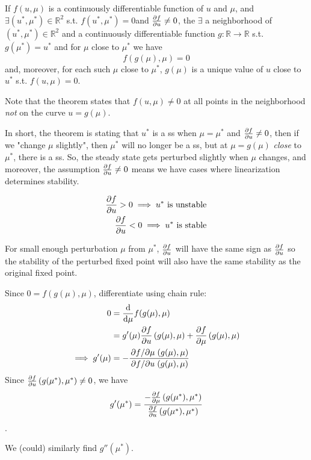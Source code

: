 \documentclass[12pt, oneside]{article}
\begin{document}
\begin{theorem}\label{thm:ift}
  If $f(u, \mu)$ is a continuously differentiable function of $u$ and $\mu$, and $\exists (u^*,\mu^*) \in \mathbb{R}^2$ s.t. $f(u^*,\mu^*) = 0$\footnotemark and $\pdv{f}{u}(u^*,\mu^*) \neq 0$, the $\exists$ a neighborhood of $(u^*, \mu^*) \in \mathbb{R}^2$ and a continuously differentiable function $g: \mathbb{R} \to \mathbb{R}$ s.t. $g(\mu^*)= u^*$ and for $\mu$ close to $\mu^*$ we have \[f(g(\mu), \mu) = 0\] and, moreover, for each such $\mu$ close to $\mu^*$, $g(\mu)$ is a unique value of $u$ close to $u^*$ s.t. $f(u, \mu) = 0$.\footnotemark
\end{theorem}


Note that the theorem states that $f(u, \mu) \neq 0$ at all points in the neighborhood \textit{not} on the curve $u = g(\mu)$.

In short, the theorem is stating that $u^*$ is a ss when $\mu = \mu^*$ and $\pdv{f}{u}(u^*, \mu^*)\neq 0$, then if we "change $\mu$ slightly", then $\mu^*$ will no longer be a ss, but at $\mu = g(\mu)$ \textit{close} to $\mu^*$, there is a ss. So, the steady state gets perturbed slightly when $\mu$ changes, and moreover, the assumption $\pdv{f}{u}(u^*, \mu^*)\neq 0$ means we have cases where linearization determines stability.

\begin{align*}
  \pdv{f}{u}(u^*, \mu^*) > 0 \implies u^* \text{ is unstable}\\
  \pdv{f}{u}(u^*, \mu^*) < 0 \implies u^* \text{ is stable}
\end{align*}

For small enough perturbation $\mu$ from $\mu^*$, $\pdv{f}{u}(g(\mu), \mu)$ will have the same sign as $\pdv{f}{u}(u^*, \mu^*)$ so the stability of the perturbed fixed point will also have the same stability as the original fixed point.

\begin{remark}
  Since $0 = f(g(\mu), \mu)$, differentiate using chain rule:
  \begin{align*}
    0 &= \dv{\mu} f(g(\mu), \mu)\\
    &= g'(\mu)\pdv{f}{u} \left(g(\mu), \mu\right) + \pdv{f}{\mu} \left(g(\mu), \mu\right)\\
    \implies g'(\mu) &= - \frac{\pdv*{f}{\mu} \left(g(\mu), \mu\right)}{\pdv*{f}{u} \left(g(\mu), \mu\right)}
  \end{align*}
  Since $\pdv{f}{u} \left(g(\mu^*), \mu^*\right) \neq 0$, we have \[g'(\mu^*) = \frac{-\pdv{f}{\mu} \left(g(\mu^*), \mu^*\right)}{\pdv{f}{u} \left(g(\mu^*), \mu^*\right)}\]. 

  We (could) similarly find $g''(\mu^*)$.
\end{remark}
\end{document}
